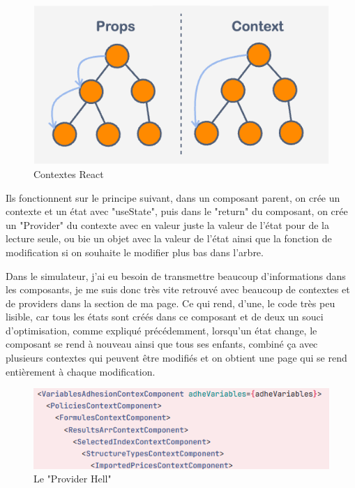 \documentclass[a4paper,12pt]{report}
\begin{document}
\begin{figure}[H]
    \centering
    \includegraphics[scale=0.4]{props+vs+context.png}
    \caption{Contextes React}
    \label{fig:context-react}
\end{figure}

Ils fonctionnent sur le principe suivant, dans un composant parent, on crée un contexte et un état avec "useState", puis dans le "return" du composant, on crée un "Provider" du contexte avec en valeur juste la valeur de l'état pour de la lecture seule, ou bie un objet avec la valeur de l'état ainsi que la fonction de modification si on souhaite le modifier plus bas dans l'arbre.

Dans le simulateur, j'ai eu besoin de transmettre beaucoup d'informations dans les composants, je me suis donc très vite retrouvé avec beaucoup de contextes et de providers dans la section de ma page. Ce qui rend, d'une, le code très peu lisible, car tous les états sont créés dans ce composant et de deux un souci d'optimisation, comme expliqué précédemment, lorsqu'un état change, le composant se rend à nouveau ainsi que tous ses enfants, combiné ça avec plusieurs contextes qui peuvent être modifiés et on obtient une page qui se rend entièrement à chaque modification.

\begin{figure}[H]
    \centering
    \includegraphics[scale=0.6]{providerHell.png}
    \caption{Le "Provider Hell"}
    \label{fig:provider-hell}
\end{figure}
\end{document}
